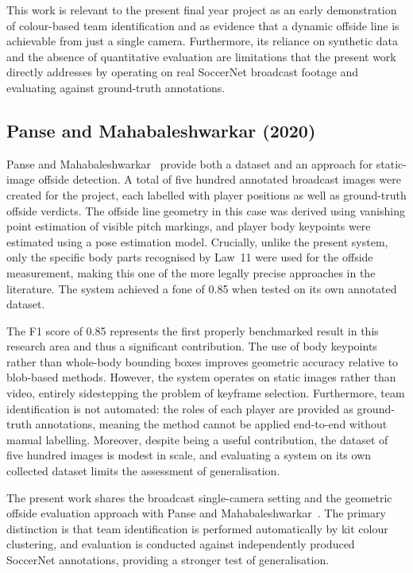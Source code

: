 This work is relevant to the present final year project as an early demonstration of colour-based team identification and as evidence that a dynamic offside line is achievable from just a single camera. Furthermore, its reliance on synthetic data and the absence of quantitative evaluation are limitations that the present work directly addresses by operating on real SoccerNet broadcast footage and evaluating against ground-truth annotations.

\subsection{Panse and Mahabaleshwarkar (2020)}%
\label{sec:lit_panse}

Panse and Mahabaleshwarkar~\cite{panse2020dataset} provide both a dataset and an approach for static-image offside detection. A total of five hundred annotated broadcast images were created for the project, each labelled with player positions as well as ground-truth offside verdicts. The offside line geometry in this case was derived using vanishing point estimation of visible pitch markings, and player body keypoints were estimated using a pose estimation model. Crucially, unlike the present system, only the specific body parts recognised by Law~11 were used for the offside measurement, making this one of the more legally precise approaches in the literature. The system achieved a \gls{fone} of 0.85 when tested on its own annotated dataset.

The F1 score of 0.85 represents the first properly benchmarked result in this research area and thus a significant contribution. The use of body keypoints rather than whole-body bounding boxes improves geometric accuracy relative to blob-based methods. However, the system operates on static images rather than video, entirely sidestepping the problem of keyframe selection. Furthermore, team identification is not automated: the roles of each player are provided as ground-truth annotations, meaning the method cannot be applied end-to-end without manual labelling. Moreover, despite being a useful contribution, the dataset of five hundred images is modest in scale, and evaluating a system on its own collected dataset limits the assessment of generalisation.

The present work shares the broadcast single-camera setting and the geometric offside evaluation approach with Panse and Mahabaleshwarkar~\cite{panse2020dataset}. The primary distinction is that team identification is performed automatically by kit colour clustering, and evaluation is conducted against independently produced SoccerNet annotations, providing a stronger test of generalisation.

